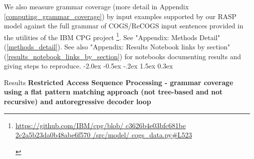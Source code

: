 \documentclass[11pt]{article}
\makeatletter
\renewcommand\section{\@startsection{section}{1}{\z@}%
                                  {-2.0ex \@plus -0.5ex \@minus -.2ex}%
                                  {1.5ex \@plus 0.3ex}%
                                  {\large\bfseries\raggedright}}
\makeatother
\begin{document}
We also measure grammar coverage \citep{fuzzingbook2023:GrammarCoverageFuzzer} (more detail in Appendix \ref{computing_grammar_coverage}) by input examples supported by our RASP model against the full grammar of COGS/ReCOGS input sentences provided in the utilities of the IBM CPG project \citep{klinger2024compositionalprogramgenerationfewshot}\footnote{\begin{footnotesize}\href{https://github.com/IBM/cpg/blob/c3626b4e03bfc681be2c2a5b23da0b48abe6f570/src/model/cogs\_data.py\#L523}{https://github.com/IBM/cpg/blob/
c3626b4e03bfc681be
2c2a5b23da0b48abe6f570
/src/model/
cogs\_data.py\#L523} 
\end{footnotesize}
}. See "Appendix: Methods Detail" (\ref{methods_detail}). See also "Appendix: Results Notebook links by section" (\ref{results_notebook_links_by_section}) for notebooks documenting results and giving steps to reproduce.
\section{Results}
\textbf{Restricted Access Sequence Processing - grammar coverage using a flat pattern matching approach (not tree-based and not recursive) and autoregressive decoder loop}
\end{document}
